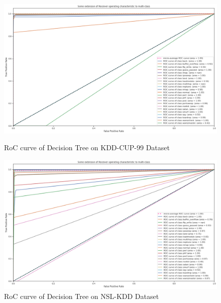 \documentclass[conference]{IEEEtran}
\begin{document}
\clearpage
\begin{figure}[h]
  \centering
  \includegraphics[width=18cm]{DT_KDD.png}
  \caption{RoC curve of Decision Tree on KDD-CUP-99 Dataset}
  \label{DT_KDD}
  \vspace*{\floatsep}%

  \includegraphics[width=18cm]{DT_NSL.png}
  \caption{RoC curve of Decision Tree on NSL-KDD Dataset}
  \label{DT_NSL}
\end{figure}
\end{document}
